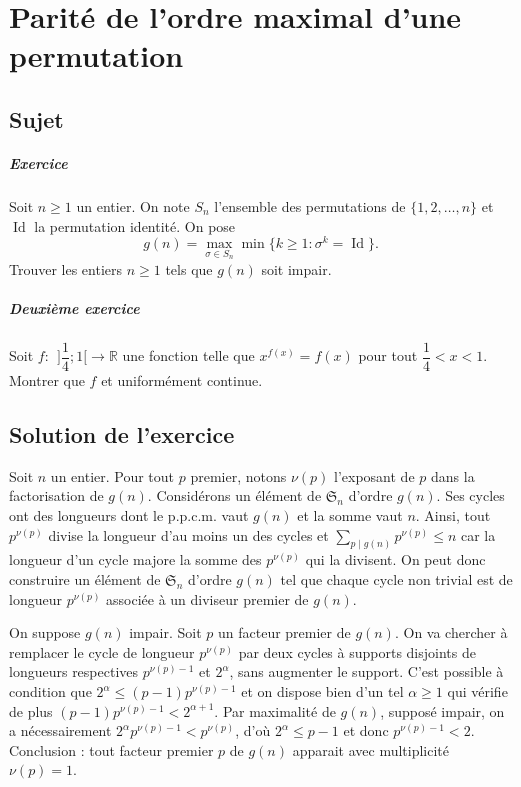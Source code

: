 \chapter{Parité de l'ordre maximal d'une permutation}

\section{Sujet}

\paragraph{Exercice}
Soit $n\geqslant 1$ un entier. On note $S_n$ l'ensemble des permutations de $\{1,2,\ldots,n\}$ et $\operatorname{Id}$ la permutation identité. On pose
\[
g(n) = \max_{\sigma \in S_n} \min\{k \geqslant 1 : \sigma^k = \operatorname{Id}\}.
\]
Trouver les entiers $n \geqslant 1$ tels que $g(n)$ soit impair.

\paragraph{Deuxième exercice}
Soit $f:\:\: ]\dfrac 14 ; 1 [ \longrightarrow \mathbb R$ une fonction telle que $x^{f(x)} = f(x)$ pour tout $\dfrac 14 <x<1.$ Montrer que $f$ et uniformément continue.

\section{Solution de l'exercice}

Soit $n$ un entier. Pour tout $p$ premier, notons $\nu(p)$ l'exposant de $p$ dans la factorisation de $g(n)$. Considérons un élément de $\mathfrak S_n$ d'ordre $g(n)$. Ses cycles ont des longueurs dont le p.p.c.m. vaut $g(n)$ et la somme vaut $n$. Ainsi, tout $p^{\nu(p)}$ divise la longueur d'au moins un des cycles et $\sum_{p\mid g(n)} p^{\nu(p)} \leq n$ car la longueur d'un cycle majore la somme des $p^{\nu(p)}$ qui la divisent. On peut donc construire un élément de $\mathfrak S_n$ d'ordre $g(n)$ tel que chaque cycle non trivial est de longueur $p^{\nu(p)}$ associée à un diviseur premier de $g(n)$.

On suppose $g(n)$ impair. Soit $p$ un facteur premier de $g(n)$. On va chercher à remplacer le cycle de longueur $p^{\nu(p)}$ par deux cycles à supports disjoints de longueurs respectives $p^{\nu(p)-1}$ et $2^\alpha$, sans augmenter le support. C'est possible à condition que $2^\alpha \leq (p-1) p^{\nu(p)-1}$ et on dispose bien d'un tel $\alpha \geq 1$ qui vérifie de plus $(p-1)p^{\nu(p)-1} < 2^{\alpha+1}$. Par maximalité de $g(n)$, supposé impair, on a nécessairement $2^\alpha p^{\nu(p)-1} < p^{\nu(p)}$, d'où $2^\alpha \leq p - 1$ et donc $p^{\nu(p)-1} < 2$. Conclusion : tout facteur premier $p$ de $g(n)$ apparait avec multiplicité $\nu(p)=1$.

